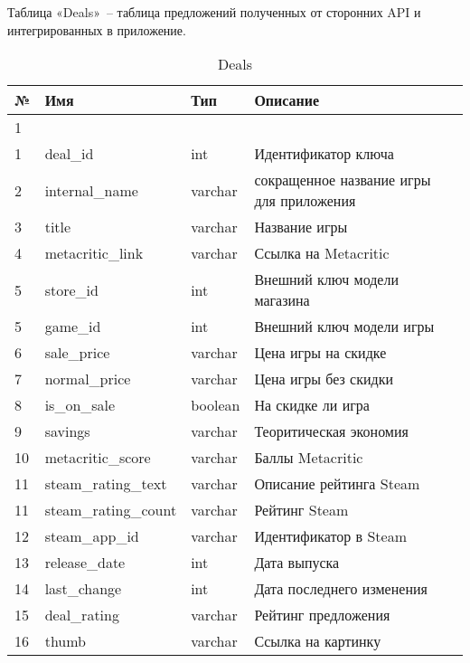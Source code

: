 Таблица «Deals»~-- таблица предложений полученных от сторонних API и интегрированных в приложение. ~\par
\begin{table}[H]
\caption{Deals}
\label{table:func:deals}
 \centering
 \begin{tabular}
 {| >{\raggedright}m{}
 | >{\centering}m{}
 | >{\centering}m{}
 | >{\centering\arraybackslash}m{}|}
   \hline
   № & Имя & Тип & Описание \\
   \hline
   1 & 2 & 3 & 4 \\
 
   \hline
   1 & deal\_id & int & Идентификатор ключа \\
   \hline
   2 & internal\_name & varchar & сокращенное название игры для приложения \\
   \hline
   3 & title & varchar & Название игры \\
   \hline
   4 & metacritic\_link & varchar & Ссылка на Metacritic \\
   \hline
   5 & store\_id & int & Внешний ключ модели магазина \\
   \hline
   5 & game\_id & int & Внешний ключ модели игры\\
   \hline
   6 & sale\_price & varchar & Цена игры на скидке\\
   \hline
   7 & normal\_price & varchar & Цена игры без скидки\\
   \hline
   8 & is\_on\_sale & boolean & На скидке ли игра\\
   \hline
   9 & savings & varchar & Теоритическая экономия\\
   \hline
   10 & metacritic\_score & varchar & Баллы Metacritic\\
   \hline
   11 & steam\_rating\_text & varchar & Описание рейтинга Steam\\
   \hline
   11 & steam\_rating\_count & varchar & Рейтинг Steam\\
   \hline
   12 & steam\_app\_id & varchar & Идентификатор в Steam\\
   \hline
   13 & release\_date & int & Дата выпуска\\
   \hline
   14 & last\_change & int & Дата последнего изменения\\
   \hline
   15 & deal\_rating & varchar & Рейтинг предложения\\
   \hline
   16 & thumb & varchar & Ссылка на картинку\\
   \hline
 \end{tabular}
\end{table}
